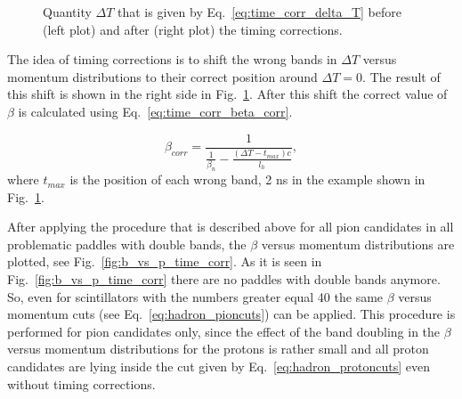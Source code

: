 \begin{figure}[htp]
\begin{center}
\caption{\small  Quantity $\Delta T$ that is given by Eq.~\ref{eq:time_corr_delta_T} before (left plot) and after (right plot) the timing corrections. \label{fig:time_corr}} 
\end{center}
\end{figure}

The idea of timing corrections is to shift the wrong bands in $\Delta T$ versus momentum distributions to their correct position around $\Delta T = 0$. The result of this shift is shown in the right side in Fig.~\ref{fig:time_corr}. After this shift the correct value of  $\beta$ is calculated using Eq.~\ref{eq:time_corr_beta_corr}.

\begin{equation}
\beta _{corr} = \frac{1}{\frac{1}{\beta _{n}}-\frac{(\Delta T-t_{max})c}{l_{h}}},
\label{eq:time_corr_beta_corr}
\end{equation}
where $t_{max}$ is the position of each wrong band, 2 ns in the example shown in Fig.~\ref{fig:time_corr}.

After applying the procedure that is described above for all pion candidates in all problematic paddles with double bands, the $\beta$ versus momentum distributions are plotted, see Fig.~\ref{fig:b_vs_p_time_corr}. 
As it is seen in Fig.~\ref{fig:b_vs_p_time_corr} there are no paddles with double bands anymore. So, even for scintillators with the numbers greater equal 40 the same $\beta$ versus momentum cuts (see Eq.~\ref{eq:hadron_pioncuts}) can be applied. This procedure is performed for pion candidates only, since the effect of the band doubling in the $\beta$ versus momentum distributions  for the protons is rather small and all proton candidates are lying inside the cut given by Eq.~\ref{eq:hadron_protoncuts} even without timing corrections.


